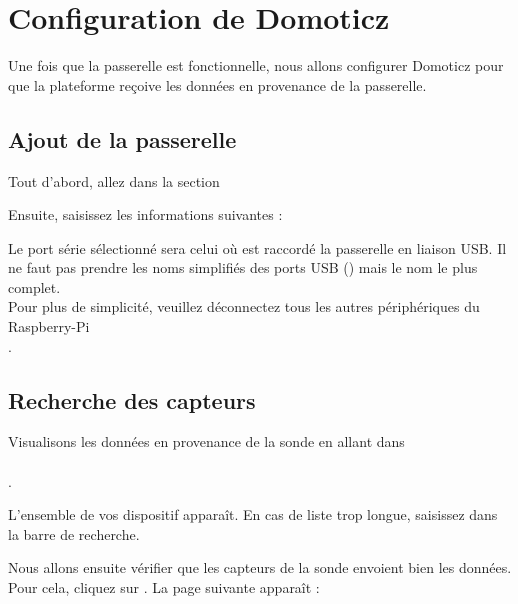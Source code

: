 \chapter{Configuration de Domoticz}

Une fois que la passerelle est fonctionnelle, nous allons configurer Domoticz pour que la plateforme reçoive 
les données en provenance de la passerelle.

\section{Ajout de la passerelle}

Tout d'abord, allez dans la section 


Ensuite, saisissez les informations suivantes :


Le port série sélectionné sera celui où est raccordé la passerelle en liaison USB.
Il ne faut pas prendre les noms simplifiés des ports USB () mais le nom le plus complet.\\
Pour plus de simplicité, veuillez déconnectez tous les autres périphériques du Raspberry-Pi\\.


\section{Recherche des capteurs}

Visualisons les données en provenance de la sonde en allant dans \\
\\.

L'ensemble de vos dispositif apparaît. En cas de liste trop longue, saisissez  dans la barre de recherche.







Nous allons ensuite vérifier que les capteurs de la sonde envoient bien les données. Pour cela, cliquez sur .
La page suivante apparaît : 

